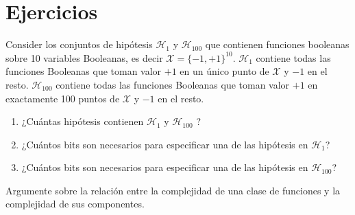 \documentclass[a4paper, 11pt]{article}
\begin{document}
    \maketitle

    \section{Ejercicios}


      \begin{ejercicio}
          Consider los conjuntos de hipótesis $\mathcal{H}_1$ y $\mathcal{H}_{100}$ que contienen funciones booleanas sobre 10 variables Booleanas, es decir $\mathcal{X} =\{-1,+1\}^{10}$. $\mathcal{H}_1$ contiene todas las funciones Booleanas que toman valor $+1$ en un único punto de $\mathcal{X}$ y $-1$ en el resto. $\mathcal{H}_{100}$ contiene todas las funciones Booleanas que toman valor $+1$ en exactamente 100 puntos de $\mathcal{X}$ y $-1$ en el resto.
          \begin{enumerate}
          \item ¿Cuántas hipótesis contienen $\mathcal{H}_1$ y $\mathcal{H}_{100}$ ?
          \item ¿Cuántos bits son necesarios para especificar una de las hipótesis en $\mathcal{H}_1$?
          \item ¿Cuántos bits son necesarios para especificar una de las hipótesis en $\mathcal{H}_{100}$?
          \end{enumerate}
          Argumente sobre la relación entre  la complejidad de una clase de funciones y la complejidad de sus componentes.
      \end{ejercicio}
\end{document}
